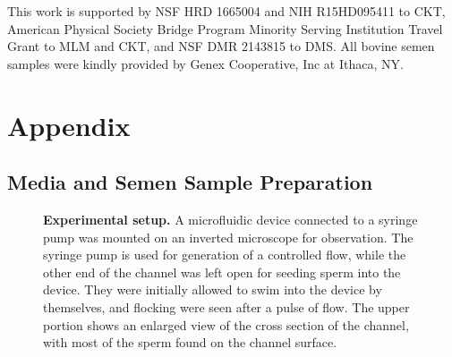 \documentclass[reprint,unsortedaddress,amsmath,amssymb,aps,pre]{revtex4-2}
\begin{document}
\begin{acknowledgments}
This work is supported by NSF HRD 1665004 and NIH R15HD095411 to CKT, American Physical Society Bridge Program Minority Serving Institution Travel Grant to MLM and CKT, and NSF DMR 2143815 to DMS. All bovine semen samples were kindly provided by Genex Cooperative, Inc at Ithaca, NY.
\end{acknowledgments}

\section{Appendix}

\subsection{Media and Semen Sample Preparation}
\begin{figure}[h]
        \caption{\label{fig::ExperimentalSetup}
        \textbf{Experimental setup.} A microfluidic device connected to a syringe pump was mounted on an inverted microscope for observation. The syringe pump is used for generation of a controlled flow, while the other end of the channel was left open for seeding sperm into the device. They were initially allowed to swim into the device by themselves, and flocking were seen after a pulse of flow. The upper portion shows an enlarged view of the cross section of the channel, with most of the sperm found on the channel surface.
        }
\end{figure}
\end{document}
